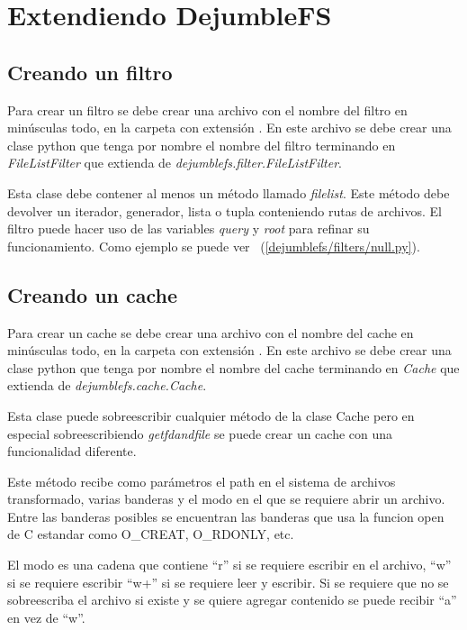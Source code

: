 \section{Extendiendo DejumbleFS}

\subsection{Creando un filtro}

Para crear un filtro se debe crear una archivo con el nombre del filtro en minúsculas todo, en la carpeta  con extensión . En este archivo se debe crear una clase python que tenga por nombre el nombre del filtro terminando en \textit{FileListFilter} que extienda de \textit{dejumblefs.filter.FileListFilter}.

Esta clase debe contener al menos un método llamado \textit{filelist}. Este método debe devolver un iterador, generador, lista o tupla conteniendo rutas de archivos. El filtro puede hacer uso de las variables \textit{query} y \textit{root} para refinar su funcionamiento. Como ejemplo se puede ver ~(\ref{dejumblefs/filters/null.py}).

\subsection{Creando un cache}

Para crear un cache se debe crear una archivo con el nombre del cache en minúsculas todo, en la carpeta  con extensión . En este archivo se debe crear una clase python que tenga por nombre el nombre del cache terminando en \textit{Cache} que extienda de \textit{dejumblefs.cache.Cache}.

Esta clase puede sobreescribir cualquier método de la clase Cache pero en especial sobreescribiendo \textit{getfdandfile} se puede crear un cache con una funcionalidad diferente.

Este método recibe como parámetros el path en el sistema de archivos transformado, varias banderas y el modo en el que se requiere abrir un archivo. Entre las banderas posibles se encuentran las banderas que usa la funcion open de C estandar como O\_CREAT, O\_RDONLY, etc.

El modo es una cadena que contiene ``r'' si se requiere escribir en el archivo, ``w'' si se requiere escribir ``w+'' si se requiere leer y escribir. Si se requiere que no se sobreescriba el archivo si existe y se quiere agregar contenido se puede recibir ``a'' en vez de ``w''.

